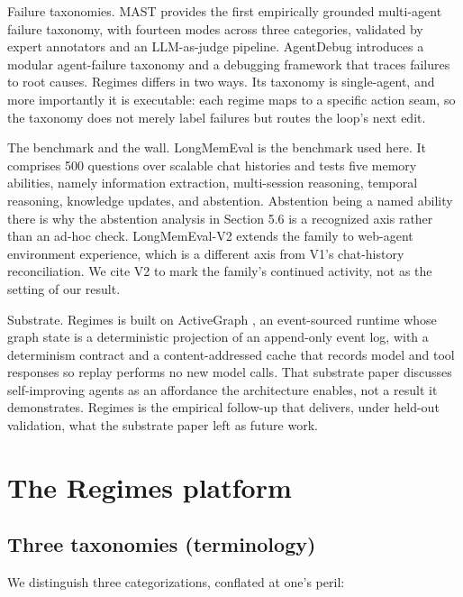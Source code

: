 Failure taxonomies. MAST \citep{cemri2025mast} provides the first empirically grounded multi-agent failure taxonomy, with fourteen modes across three categories, validated by expert annotators and an LLM-as-judge pipeline. AgentDebug \citep{zhu2025agentdebug} introduces a modular agent-failure taxonomy and a debugging framework that traces failures to root causes. Regimes differs in two ways. Its taxonomy is single-agent, and more importantly it is executable: each regime maps to a specific action seam, so the taxonomy does not merely label failures but routes the loop's next edit.

The benchmark and the wall. LongMemEval \citep[ICLR 2025]{wu2024longmemeval} is the benchmark used here. It comprises 500 questions over scalable chat histories and tests five memory abilities, namely information extraction, multi-session reasoning, temporal reasoning, knowledge updates, and abstention. Abstention being a named ability there is why the abstention analysis in Section 5.6 is a recognized axis rather than an ad-hoc check. LongMemEval-V2 \citep{wu2026longmemeval2} extends the family to web-agent environment experience, which is a different axis from V1's chat-history reconciliation. We cite V2 to mark the family's continued activity, not as the setting of our result.

Substrate. Regimes is built on ActiveGraph \citep[``The Log is the Agent'']{nakajima2026log}, an event-sourced runtime whose graph state is a deterministic projection of an append-only event log, with a determinism contract and a content-addressed cache that records model and tool responses so replay performs no new model calls. That substrate paper discusses self-improving agents as an affordance the architecture enables, not a result it demonstrates. Regimes is the empirical follow-up that delivers, under held-out validation, what the substrate paper left as future work.


\section{The Regimes platform}

\subsection{Three taxonomies (terminology)}

We distinguish three categorizations, conflated at one's peril:

